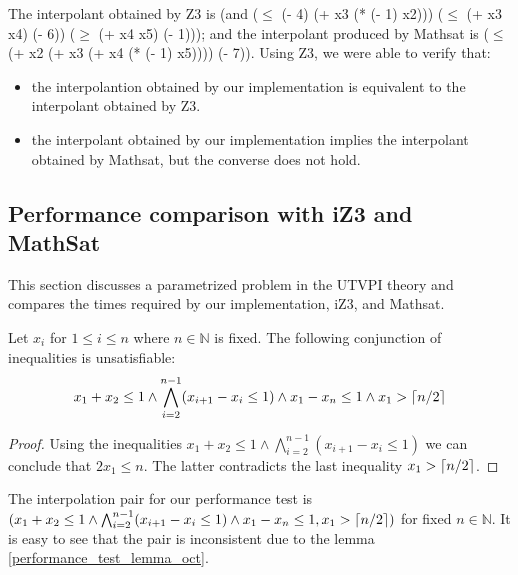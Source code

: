 

The interpolant obtained by Z3 is 
 (and ($\leq$ (- 4) (+ x3 (* (- 1) x2))) ($\leq$ (+ x3 x4) (- 6)) ($\geq$ (+ x4 x5) (- 1))); 
 and the interpolant produced by Mathsat is ($\leq$ (+ x2 (+ x3 (+ x4 (* (- 1) x5)))) (- 7)).
 Using Z3, we were able to verify that: 
 \begin{itemize}
 \item the interpolantion obtained by our implementation
 is equivalent to the interpolant obtained by Z3. 
 \item the interpolant obtained by our implementation implies the interpolant
 obtained by Mathsat, but the converse does not hold.
 \end{itemize}



\subsection{Performance comparison with iZ3 and MathSat}\label{performance_oct}

This section discusses a parametrized problem 
in the UTVPI theory and compares the times required by
our implementation, iZ3, and Mathsat.

\begin{lemma} \label{performance_test_lemma_oct}
  Let $x_i$ for $1 \leq i \leq n$ where $n \in \mathbb{N}$ is fixed.
  The following conjunction of inequalities is unsatisfiable:
  \begin{equation*}\label{oct_problem}
    x_1 + x_2 \leq 1 
    \land \bigwedge_{i=2}^{n-1} (x_{i+1} - x_i \leq 1) 
    \land x_1 - x_n \leq 1
    \land x_1 > \ceil{n/2}
  \end{equation*}
\end{lemma}

\begin{proof}
  Using the inequalities $x_1 + x_2 \leq 1 
  \land \bigwedge_{i=2}^{n-1} (x_{i+1} - x_i \leq 1)$
   we can conclude that $2x_1 \leq n$.
  The latter contradicts the last inequality $x_1 > \lceil n/2\rceil$.
\end{proof}

The interpolation pair for our performance test 
is $(x_1 + x_2 \leq 1 
    \land \bigwedge_{i=2}^{n-1} (x_{i+1} - x_i \leq 1) 
    \land x_1 - x_n \leq 1, x_1 > \lceil n/2\rceil)$
for fixed $n \in \mathbb{N}$.
It is easy to see that the pair is inconsistent due to the lemma 
\ref{performance_test_lemma_oct}. 

